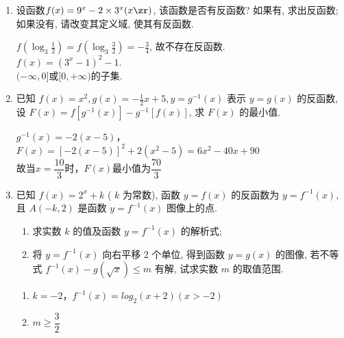 \begin{enumerate}
\item 设函数$f(x)=9^x-2\times3^x(x\zr)$, 该函数是否有反函数? 如果有, 求出反函数; 如果没有, 请改变其定义域, 使其有反函数. 
\begin{jieda}
$f(\log_3\frac{1}{2})=f(\log_3\frac{3}{2})=-\frac{3}{4}$, 故不存在反函数. \\
$f(x)=(3^x-1)^2-1$. \\
$(-\infty,0]$或$[0,+\infty)$的子集. 
\end{jieda}

\item 已知 $f(x)=x^2, g(x)=-\frac{1}{2} x+5, y=g^{-1}(x)$ 表示 $y=g(x)$ 的反函数, 设 $F(x)=f\left[g^{-1}(x)\right]-g^{-1}[f(x)]$, 求 $F(x)$ 的最小值.
\begin{jieda}
    $g^{-1}(x) = -2(x-5)$，$F(x) = \left[-2(x-5)\right]^2 + 2(x^2-5) = 6x^2 - 40x + 90$ \\
    故当$x = \dfrac{10}{3}$时，$F(x)$最小值为$\dfrac{70}{3}$
\end{jieda}
\begin{vspace_}
    \vsp[3]
\end{vspace_}

\item 已知 $f(x)=2^x+k$ ( $k$ 为常数), 函数 $y=f(x)$ 的反函数为 $y=f^{-1}(x)$, 且 $A(-k, 2)$ 是函数 $y=f^{-1}(x)$ 图像上的点.
\begin{enumerate}
\item 求实数 $k$ 的值及函数 $y=f^{-1}(x)$ 的解析式;
\item 将 $y=f^{-1}(x)$ 向右平移 2 个单位, 得到函数 $y=g(x)$ 的图像, 若不等式 $f^{-1}(x)-g(\sqrt{x}) \leq m$ 有解, 试求实数 $m$ 的取值范围.
\end{enumerate}
\begin{jieda}
\begin{enumerate}
    \item $k = -2$，$f^{-1}(x) = log_2(x+2)(x>-2)$ 
    \item $m \geq \dfrac{3}{2}$
\end{enumerate}
\end{jieda}
\begin{vspace_}
    \vsp[3]
\end{vspace_}

\end{enumerate}

